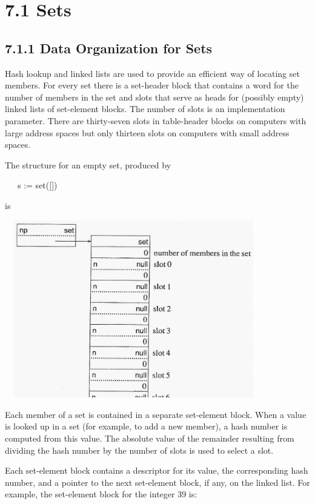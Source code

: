 \section[7.1 Sets]{7.1 Sets}
\subsection[7.1.1 Data Organization for Sets]{7.1.1 Data Organization for Sets}

Hash lookup and linked lists are used to provide an efficient way of
locating set members. For every set there is a set-header block that
contains a word for the number of members in the set and slots that
serve as heads for (possibly empty) linked lists of set-element
blocks. The number of slots is an implementation parameter. There are
thirty-seven slots in table-header blocks on computers with large
address spaces but only thirteen slots on computers with small address
spaces.

The structure for an empty set, produced by

\ \ \ s := set([])

\noindent is

\ \  \includegraphics[width=4.1681in,height=3.0484in]{ib-img/ib-img034.jpg} 

Each member of a set is contained in a separate set-element
block. When a value is looked up in a set (for example, to add a new
member), a hash number is computed from this value. The absolute value
of the remainder resulting from dividing the hash number by the number
of slots is used to select a slot.

Each set-element block contains a descriptor for its value, the
corresponding hash number, and a pointer to the next set-element
block, if any, on the linked list. For example, the set-element block
for the integer 39 is:


